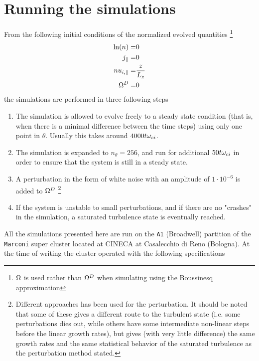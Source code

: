\section{Running the simulations}
\label{sec:initRun}
%
From the following initial conditions of the normalized evolved quantities%
%
\footnote{$\Omega$ is used rather than $\Omega^D$ when simulating using the Boussinesq approximation}%
%
\begin{align*}
    \ln(n)    =& 0\\
    j_\|      =& 0\\
    nu_{i,\|} =& \frac{z}{L_z}\\
    \Omega^D     =& 0
\end{align*}
%
the simulations are performed in three following steps
%
\begin{enumerate}[noitemsep]
    \item The simulation is allowed to evolve freely to a steady state condition (that is, when there is a minimal difference between the time steps) using only one point in $\theta$.
        Usually this takes around $4000t\omega_{ci}$.
    \item The simulation is expanded to $n_\theta = 256$, and run for additional $50t\omega_{ci}$ in order to ensure that the system is still in a steady state.
    \item A perturbation in the form of white noise with an amplitude of $1\cdot10^{-6}$ is added to $\Omega^D$%
        \footnote{Different approaches has been used for the perturbation.
            It should be noted that some of these gives a different route to the turbulent state (i.e. some perturbations dies out, while others have some intermediate non-linear steps before the linear growth rates), but gives (with very little difference) the same growth rates and the same statistical behavior of the saturated turbulence as the perturbation method stated.}%
    \item If the system is unstable to small perturbations, and if there are no "crashes" in the simulation, a saturated turbulence state is eventually reached.
\end{enumerate}
%
All the simulations presented here are run on the \texttt{A1} (Broadwell) partition of the \texttt{Marconi} super cluster located at CINECA at Casalecchio di Reno (Bologna).
At the time of writing the cluster operated with the following specifications \cite{Marconi2016Web}
%
